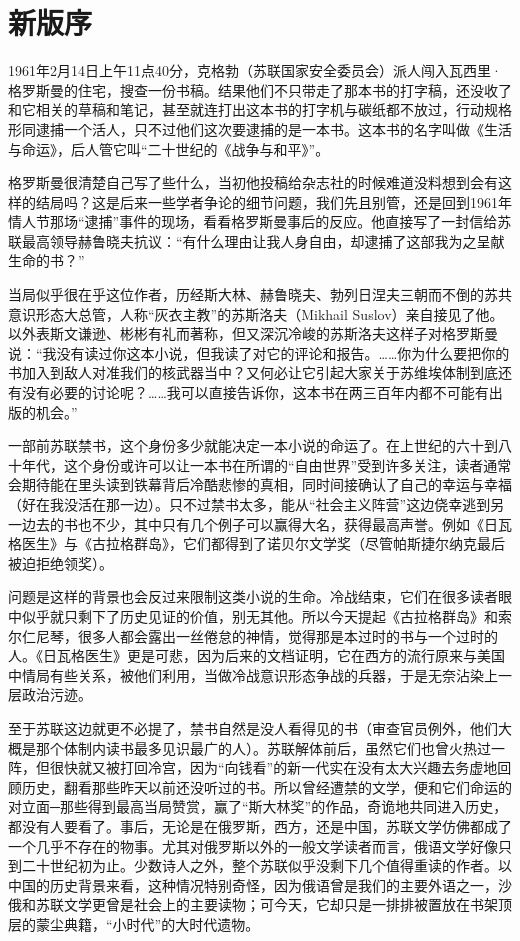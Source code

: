 \section{ 新版序}

1961年2月14日上午11点40分，克格勃（苏联国家安全委员会）派人闯入瓦西里·格罗斯曼的住宅，搜查一份书稿。结果他们不只带走了那本书的打字稿，还没收了和它相关的草稿和笔记，甚至就连打出这本书的打字机与碳纸都不放过，行动规格形同逮捕一个活人，只不过他们这次要逮捕的是一本书。这本书的名字叫做《生活与命运》，后人管它叫“二十世纪的《战争与和平》”。

格罗斯曼很清楚自己写了些什么，当初他投稿给杂志社的时候难道没料想到会有这样的结局吗？这是后来一些学者争论的细节问题，我们先且别管，还是回到1961年情人节那场“逮捕”事件的现场，看看格罗斯曼事后的反应。他直接写了一封信给苏联最高领导赫鲁晓夫抗议：“有什么理由让我人身自由，却逮捕了这部我为之呈献生命的书？”

当局似乎很在乎这位作者，历经斯大林、赫鲁晓夫、勃列日涅夫三朝而不倒的苏共意识形态大总管，人称“灰衣主教”的苏斯洛夫（Mikhail Suslov）亲自接见了他。以外表斯文谦逊、彬彬有礼而著称，但又深沉冷峻的苏斯洛夫这样子对格罗斯曼说：“我没有读过你这本小说，但我读了对它的评论和报告。……你为什么要把你的书加入到敌人对准我们的核武器当中？又何必让它引起大家关于苏维埃体制到底还有没有必要的讨论呢？……我可以直接告诉你，这本书在两三百年内都不可能有出版的机会。”

一部前苏联禁书，这个身份多少就能决定一本小说的命运了。在上世纪的六十到八十年代，这个身份或许可以让一本书在所谓的“自由世界”受到许多关注，读者通常会期待能在里头读到铁幕背后冷酷悲惨的真相，同时间接确认了自己的幸运与幸福（好在我没活在那一边）。只不过禁书太多，能从“社会主义阵营”这边侥幸逃到另一边去的书也不少，其中只有几个例子可以赢得大名，获得最高声誉。例如《日瓦格医生》与《古拉格群岛》，它们都得到了诺贝尔文学奖（尽管帕斯捷尔纳克最后被迫拒绝领奖）。

问题是这样的背景也会反过来限制这类小说的生命。冷战结束，它们在很多读者眼中似乎就只剩下了历史见证的价值，别无其他。所以今天提起《古拉格群岛》和索尔仁尼琴，很多人都会露出一丝倦怠的神情，觉得那是本过时的书与一个过时的人。《日瓦格医生》更是可悲，因为后来的文档证明，它在西方的流行原来与美国中情局有些关系，被他们利用，当做冷战意识形态争战的兵器，于是无奈沾染上一层政治污迹。

至于苏联这边就更不必提了，禁书自然是没人看得见的书（审查官员例外，他们大概是那个体制内读书最多见识最广的人）。苏联解体前后，虽然它们也曾火热过一阵，但很快就又被打回冷宫，因为“向钱看”的新一代实在没有太大兴趣去务虚地回顾历史，翻看那些昨天以前还没听过的书。所以曾经遭禁的文学，便和它们命运的对立面─那些得到最高当局赞赏，赢了“斯大林奖”的作品，奇诡地共同进入历史，都没有人要看了。事后，无论是在俄罗斯，西方，还是中国，苏联文学仿佛都成了一个几乎不存在的物事。尤其对俄罗斯以外的一般文学读者而言，俄语文学好像只到二十世纪初为止。少数诗人之外，整个苏联似乎没剩下几个值得重读的作者。以中国的历史背景来看，这种情况特别奇怪，因为俄语曾是我们的主要外语之一，沙俄和苏联文学更曾是社会上的主要读物；可今天，它却只是一排排被置放在书架顶层的蒙尘典籍，“小时代”的大时代遗物。

